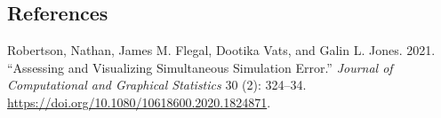 \documentclass[
  letterpaper,
  DIV=11,
  numbers=noendperiod]{scrartcl}
\newlength{\cslhangindent}
\newlength{\cslentryspacingunit} %
\newenvironment{CSLReferences}[2] %
 {%
  \setlength{\parindent}{0pt}
  \ifodd #1
  \let\oldpar\par
  \def\par{\hangindent=\cslhangindent\oldpar}
  \fi
  \setlength{\parskip}{#2\cslentryspacingunit}
 }%
 {}
\begin{document}
\hypertarget{references}{%
\subsection{References}\label{references}}

\hypertarget{refs}{}
\begin{CSLReferences}{1}{0}
\leavevmode{}%
Robertson, Nathan, James M. Flegal, Dootika Vats, and Galin L. Jones.
2021. {``Assessing and Visualizing Simultaneous Simulation Error.''}
\emph{Journal of Computational and Graphical Statistics} 30 (2):
324--34. \url{https://doi.org/10.1080/10618600.2020.1824871}.

\end{CSLReferences}
\end{document}
